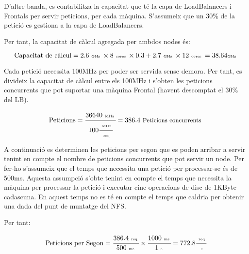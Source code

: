 D'altre banda, es contabilitza la capacitat que té la capa de LoadBalancers i Frontals per servir peticions, per cada màquina. S'assumeix que un 30\% de la petició es gestiona a la capa de LoadBalancers. 

Per tant, la capacitat de càlcul agregada per ambdos nodes és:


\begin{equation}
    \text{Capacitat de càlcul} = 2.6 \text{ \tiny{GHz}      } \times
                                   8 \text{ \tiny{cores}    } \times 
                                 0.3 + 
                                 2.7 \text{ \tiny{GHz}      } \times 
                                 12  \text{ \tiny{cores}    } 
                                 = 38.64 \text{\tiny{GHz}   }
\end{equation}


Cada petició necessita 100MHz per poder ser servida sense demora. Per tant, es divideix la capacitat de càlcul entre els 100MHz i s'obten les peticions concurrents que pot suportar una màquina Frontal (havent descomptat el 30\% del LB). 

\begin{equation}
    \text{Peticions} = \cfrac { 36640   \text{  \tiny{MHz}  }    }
                              { 100     \cfrac{\text{   \tiny{MHz}   }}
                                              {\text{   \tiny{req}   }}
                              }                                              
                       = 386.4 \text{  \small{Peticions concurrents}  } 
\end{equation}


A continuació es determinen les peticions per segon que es poden arribar a servir tenint en compte el nombre de peticions concurrents que pot servir un node. Per fer-ho s'assumeix que el temps que necessita una petició per processar-se és de 500ms. Aquesta assumpció s'obte tenint en compte el temps que necessita la màquina per processar la petició i executar cinc operacions de disc de 1KByte cadascuna. En aquest temps no es té en compte el temps que caldria per obtenir una dada del punt de muntatge del NFS. 

Per tant:

\begin{equation}
   \text{Peticions per Segon} = \cfrac{
                                    386.4   \text{ \tiny{req}  }   
                                }
                                {
                                    500     \text{ \tiny{ms}  }   
                                }
                                \times
                                \cfrac{
                                    1000    \text{ \tiny{ms}  }   
                                }
                                {
                                    1       \text{ \tiny{s}  }   
                                }
                                = 772.8
                                    \cfrac{\text{   \tiny{req}   }}
                                          {\text{   \tiny{s}     }}
\end{equation}

